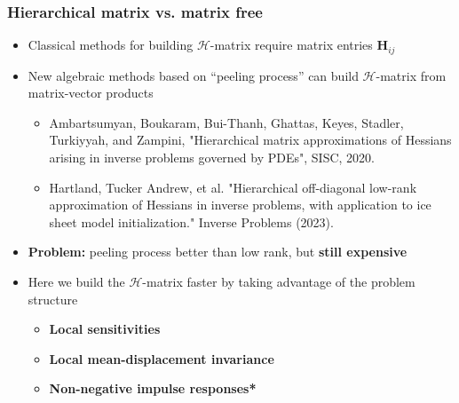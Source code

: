 \documentclass[10pt,final,xcolor=dvipsnames]{beamer}
\begin{document}
\begin{frame}
	\frametitle{Hierarchical matrix vs. matrix free}
	\begin{itemize}
		\setlength\itemsep{1.5em}
		\item Classical methods for building $\mathcal{H}$-matrix require matrix entries $\mathbf{H}_{ij}$ 
		\item New algebraic methods based on ``peeling process'' can build $\mathcal{H}$-matrix from matrix-vector products
		\begin{itemize}
			\item {\scriptsize Ambartsumyan, Boukaram, Bui-Thanh, Ghattas, Keyes, Stadler,
				Turkiyyah, and Zampini, "Hierarchical matrix approximations of Hessians arising in inverse problems governed by PDEs", SISC, 2020.}
			\item {\scriptsize Hartland, Tucker Andrew, et al. "Hierarchical oﬀ-diagonal low-rank approximation of Hessians in inverse problems, with application to ice sheet model initialization." Inverse Problems (2023).}
		\end{itemize} 
		\item \textbf{Problem:} peeling process better than low rank, but \textbf{still expensive}
		\item Here we build the $\mathcal{H}$-matrix faster by taking advantage of the problem structure
		\begin{itemize}
			\item \textbf{Local sensitivities}
			\item \textbf{Local mean-displacement invariance}
			\item \textbf{Non-negative impulse responses*}
		\end{itemize}
	\end{itemize}
\end{frame}
\end{document}
